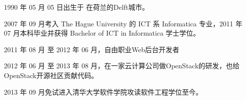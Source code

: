 \begin{resume}


  1990 年 05 月 05 日出生于 在荷兰的Delft城市。

  2007 年 09 月考入 The Hague University 的 ICT 系 Informatica 专业，2011 年 07 月本科毕业并获得 Bachelor of ICT in Informatica  学士学位。

  2011 年 08 月 至 2012 年 06 月，自由职业Web后台开发者

  2012 年 06 月 至 2013 年 08 月，在一家云计算公司做OpenStack的研发，也给OpenStack开源社区贡献代码。

  2013 年 09 月免试进入清华大学软件学院攻读软件工程学位至今。

\end{resume}
